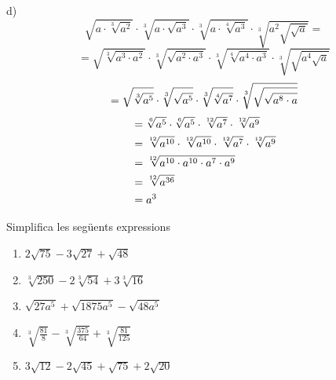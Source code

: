 \begin{solucio}
d)%
\begin{equation*}
\sqrt{a\cdot \sqrt[3]{a^{2}}}\cdot \sqrt[3]{a\cdot \sqrt{a^{3}}}\cdot \sqrt[3%
]{a\cdot \sqrt[4]{a^{3}}}\cdot \sqrt[3]{a^{2}\sqrt{\sqrt{a}}}=
\end{equation*}%
\begin{equation*}
=\sqrt{\sqrt[3]{a^{3}\cdot a^{2}}}\cdot \sqrt[3]{\sqrt{a^{2}\cdot a^{3}}}%
\cdot \sqrt[3]{\sqrt[4]{a^{4}\cdot a^{3}}}\cdot \sqrt[3]{\sqrt{a^{4}\sqrt{a}}%
}
\end{equation*}%
\begin{equation*}
=\sqrt{\sqrt[3]{a^{5}}}\cdot \sqrt[3]{\sqrt{a^{5}}}\cdot \sqrt[3]{\sqrt[4]{%
a^{7}}}\cdot \sqrt[3]{\sqrt{\sqrt{a^{8}\cdot a}}}
\end{equation*}%
\begin{align*}
&=\sqrt[6]{a^{5}}\cdot \sqrt[6]{a^{5}}\cdot \sqrt[12]{a^{7}}\cdot \sqrt[12]{%
a^{9}} \\
&=\sqrt[12]{a^{10}}\cdot \sqrt[12]{a^{10}}\cdot \sqrt[12]{a^{7}}\cdot \sqrt[%
12]{a^{9}} \\
&=\sqrt[12]{a^{10}\cdot a^{10}\cdot a^{7}\cdot a^{9}} \\
&=\sqrt[12]{a^{36}} \\
&=a^{3}
\end{align*}
\end{solucio}

\begin{exercici}
Simplifica les següents expressions

\begin{enumerate}
\item[a)] $2\sqrt{75}-3\sqrt{27}+\sqrt{48}$

\item[b)] $\sqrt[3]{250}-2\sqrt[3]{54}+3\sqrt[3]{16}$

\item[c)] $\sqrt{27a^{5}}+\sqrt{1875a^{5}}-\sqrt{48a^{5}}$

\item[d)] $\sqrt[3]{\frac{81}{8}}-\sqrt[3]{\frac{375}{64}}+\sqrt[3]{\frac{81%
}{125}}$

\item[e)] $3\sqrt{12}-2\sqrt{45}+\sqrt{75}+2\sqrt{20}$
\end{enumerate}

\end{exercici}

